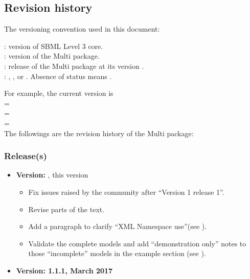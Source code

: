 \subsection{Revision history}
\label{def:revision_history}

The versioning convention used in this document: \\

: version of SBML Level 3 core. \\
: version of the Multi package. \\
: release of the Multi package at its version . \\ 
: , , or . Absence of status means .

For example, the current version is \val{\thisVersion} \\
 = \val{\thisCoreVersion} \\
 = \val{\thisMultiVersion} \\
 = \val{\thisMultiRelease} \\

The followings are the revision history of the Multi package:

\newcommand{\mVersionTileFont}[1]{\textbf{#1}}


\subsubsection{Release(s)}

\begin{itemize}
  \mBlockChangedBegin{\revTwentyTwentyMarch}
    \item \mVersionTileFont{Version: \revTwentyTwentyMarch}, this version
    \label{def:v1_2}
    \begin{itemize}
     \item Fix issues raised by the community after ``Version 1 release 1''.
     \item Revise parts of the text.
     \item Add a paragraph to clarify ``XML Namespace use''(see ).
     \item Validate the complete models and add ``demonstration only'' notes to those ``incomplete'' models in the example section (see ).
    \end{itemize}

  \mBlockChangedEnd{\revTwentyTwentyMarch} 

    \item \mVersionTileFont{Version: 1.1.1, March 2017} 
    \label{def:v1_1_1}
\end{itemize}


